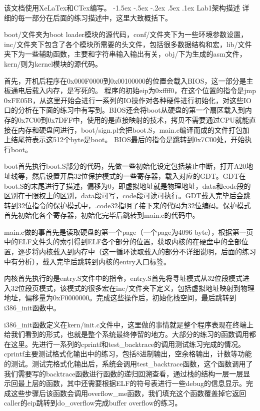\documentclass[a4paper, 11pt]{ctexart}
\makeatletter
\newcommand{\sihao}{\fontsize{14pt}{\baselineskip}\selectfont}
\renewcommand\section{\@startsection{section}{1}{\z@}%
{-1.5ex \@plus -.5ex \@minus -.2ex}%
{.5ex \@plus .1ex}%
{\normalfont\sihao\CJKfamily{hei}}}
\makeatother
\begin{document}
该文档使用XeLaTex和CTex编写。
\section{Lab1架构描述}
详细的每一部分在后面的练习描述中，这里大致概括下。

boot/文件夹为boot loader模块的源代码，conf/文件夹下为一些环境参数设置，inc/文件夹下包含了各个模块所需要的头文件，包括很多数据结构和宏，lib/文件夹下为一些辅助函数，主要和字符串输入输出有关，obj/下为生成的asm文件，kern/则为kernel模块的源代码。

首先，开机后程序在0x000F0000到0x00100000的位置会载入BIOS，这一部分是主板通电后载入内存，是写死的。
程序的初始eip为0xffff0，在这个位置的指令是jmp 0xFE05B，从这里开始会进行一系列的IO操作对各种硬件进行初始化，对这些IO口的分析在下面的练习中有写到。BIOS还会将boot从硬盘的第一个扇区载入到内存的0x7C00到0x7DFF中，使用的是直接映射的技术，拷贝不需要通过CPU就能直接在内存和硬盘间进行，boot/sign.pl会把boot.S，main.c编译而成的文件打包加上结尾符表示这512个byte是boot。
BIOS最后的指令是跳转到0x7C00处，开始执行boot。

boot首先执行boot.S部分的代码，先做一些初始化设定包括禁止中断，打开A20地址线等，然后设置开启32位保护模式的一些寄存器，载入对应的GDT。GDT在boot.S的末尾进行了描述，偏移为0，即虚拟地址就是物理地址，data和code段的区别在于限权上的区别，data段可写，code段可读可执行。GDT载入完毕后会跳转到32位指令的保护模式中，.code32指明了接下来的代码为32位编码。保护模式首先初始化各个寄存器，初始化完毕后跳转到main.c的代码中。

main.c做的事首先是读取硬盘的第一个page（一个page为4096 byte），根据第一页中的ELF文件头的索引得到ELF各个部分的位置，获取内核的在硬盘中的全部位置，逐步将内核载入到内存中（这一循环读取载入的部分不详细说明，后面的练习中有分析），载入完毕后跳转到内核的entry入口标签。

内核首先执行的是entry.S文件中的指令，entry.S首先将寻址模式从32位段模式进入32位段页模式，该模式的很多宏在inc/文件夹下定义，包括虚拟地址映射到物理地址，偏移量为0xF0000000。完成这些操作后，初始化栈空间，最后跳转到i386\_init函数中。

i386\_init函数定义在kern/init.c文件中，这里做的事情就是整个程序表现在终端上给我们看到的形式，也就是整个系统最终停留的地方。大部分的练习的函数调用都在这里。先进行一系列的cprintf和test\_backtrace的调用测试练习完成的情况。cprintf主要测试格式化输出中的练习，包括8进制输出，空余格输出，计数等功能的测试。测试完格式化输出后，系统会调用test\_backtrace函数，这个函数调用了我们需要写的backtrace函数进行函数的递归回溯查看，通过栈的结构一层一层显示回最上层的函数，其中还需要根据ELF的符号表进行一些debug的信息显示。完成这些步骤后该函数会调用overflow\_me函数，我们填充这个函数覆盖掉它返回caller的eip跳转到do\_overflow完成buffer overflow的练习。
\end{document}
